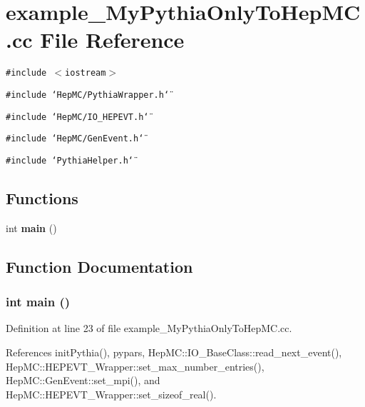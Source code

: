\section{example\_\-My\-Pythia\-Only\-To\-Hep\-MC.cc File Reference}
\label{example__MyPythiaOnlyToHepMC_8cc}
{\tt \#include $<$iostream$>$}\par
{\tt \#include \char`\"{}Hep\-MC/Pythia\-Wrapper.h\char`\"{}}\par
{\tt \#include \char`\"{}Hep\-MC/IO\_\-HEPEVT.h\char`\"{}}\par
{\tt \#include \char`\"{}Hep\-MC/Gen\-Event.h\char`\"{}}\par
{\tt \#include \char`\"{}Pythia\-Helper.h\char`\"{}}\par
\subsection*{Functions}
\begin{CompactItemize}
\item 
int {\bf main} ()
\end{CompactItemize}


\subsection{Function Documentation}
\subsubsection{\setlength{\rightskip}{0pt plus 5cm}int main ()}\label{example__MyPythiaOnlyToHepMC_8cc_e66f6b31b5ad750f1fe042a706a4e3d4}




Definition at line 23 of file example\_\-My\-Pythia\-Only\-To\-Hep\-MC.cc.

References init\-Pythia(), pypars, Hep\-MC::IO\_\-Base\-Class::read\_\-next\_\-event(), Hep\-MC::HEPEVT\_\-Wrapper::set\_\-max\_\-number\_\-entries(), Hep\-MC::Gen\-Event::set\_\-mpi(), and Hep\-MC::HEPEVT\_\-Wrapper::set\_\-sizeof\_\-real().